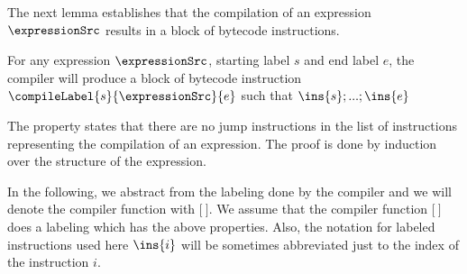 The next lemma establishes that the compilation of an expression $\expressionSrc$ results in
 a block of bytecode instructions.  
\begin{compProp3}\label{compProp3}
    For any expression $\expressionSrc$, starting label $s$ and end label $e$,
    the compiler will produce a block of bytecode instruction $\compileLabel{s}{\expressionSrc}{e}$ such that
    $\ins{s};...;\ins{e}$           
\end{compProp3}
The property states that there are no jump instructions  in the list of instructions representing the  compilation of an expression. 
The proof is done by induction over the structure of the expression.


 In the following, we  abstract
 from the labeling done by the compiler and we  will denote the compiler function with $ \lbrack \ \rbrack $.
 We assume that the compiler function $ \lbrack \ \rbrack $ does a labeling which has the above properties.
 Also, the notation for labeled instructions used here $ \ins{i} $ will be sometimes abbreviated just to the index of the instruction $ i $. 













 
